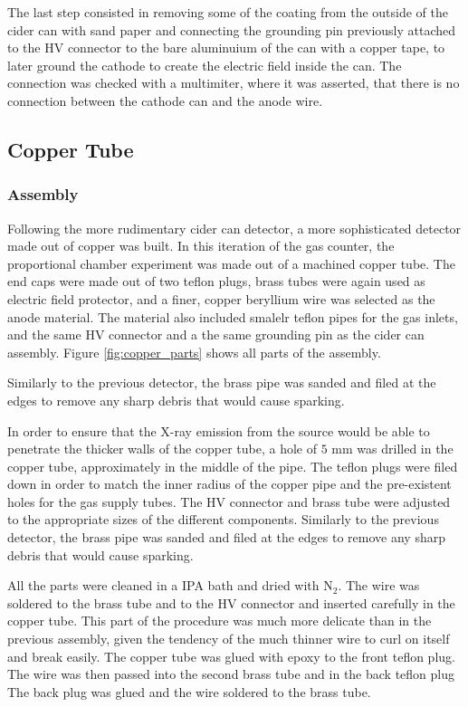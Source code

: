 The last step consisted in removing some of the coating from the outside of the
cider can with sand paper and connecting the grounding pin previously attached
to the HV connector to the bare aluminuium of the can with a copper tape, to
later ground the cathode to create the electric field inside the can. The
connection was checked with a multimiter, where it was asserted, that there is
no connection between the cathode can and the anode wire.

\subsection{Copper Tube}
\subsubsection{Assembly}
Following the more rudimentary cider can detector, a more sophisticated detector made out of copper was built. In this iteration of the gas counter, the  proportional chamber experiment was made out of a machined copper tube. The end caps were made out of two teflon plugs, brass tubes were again used as electric field protector, and a finer, copper beryllium wire was selected as the anode material. The material also included smalelr teflon pipes for the gas inlets, and the same HV connector and a the same grounding pin as the cider can assembly. Figure \ref{fig:copper_parts} shows all parts of the assembly.

Similarly to the previous detector, the brass pipe was sanded and filed at the edges to remove any sharp debris that would cause sparking.

In order to ensure that the X-ray emission from the source would be able to penetrate the thicker walls of the copper tube, a hole of $5$ mm was drilled in the copper tube, approximately in the middle of the pipe. The teflon plugs were filed down in order to match the inner radius of the copper pipe and the pre-existent holes for the gas supply tubes. The HV connector and brass tube were adjusted to the appropriate sizes of the different components. Similarly to the previous detector, the brass pipe was sanded and filed at the edges to remove any sharp debris that would cause sparking.

All the parts were cleaned in a IPA bath and dried with N$_2$. The wire was soldered to the brass tube and to the HV connector and inserted carefully in the copper tube. This part of the procedure was much more delicate than in the previous assembly, given the tendency of the much thinner wire to curl on itself and break easily. The copper tube was glued with epoxy to the front teflon plug. The wire was then passed into the second brass tube and in the back teflon plug  The back plug was glued and the wire soldered to the brass tube.

